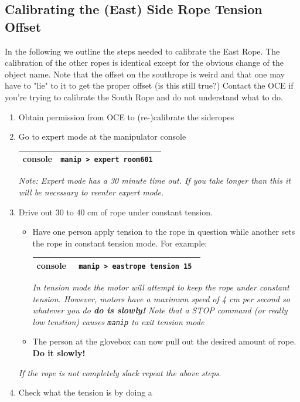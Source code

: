 \documentclass[11pt]{article}
\begin{document}
\subsection{Calibrating the (East) Side Rope Tension Offset}
In the following we outline the steps needed to calibrate the East Rope. The calibration of the other ropes is identical except for the obvious change of the object name. Note that the offset on the southrope is weird and that one may have to "lie" to it to get the proper offset (is this still true?) Contact the OCE if you're trying to calibrate the South Rope and do not understand what to do.
\begin{enumerate}
\item \CheckBox[name=cesr1]{} Obtain permission from OCE to (re-)calibrate the sideropes
\item \CheckBox[name=cesr2]{} Go to expert mode at the manipulator console
\begin{center}
\begin{tabular}{|c|c|}
\hline
console & \verb+manip > expert room601 +\\
\hline
\end{tabular}
\end{center}
{\it Note: Expert mode has a 30 minute time out. If you take longer than this it will be necessary to reenter expert mode.}
\item \CheckBox[name=cesr3]{} Drive out 30 to 40 cm of rope under constant tension.
\begin{itemize}
\item Have one person apply tension to the rope in question while another sets the rope in constant tension mode. For example:
\begin{center}
\begin{tabular}{|c|c|}
\hline
console & \verb+ manip > eastrope tension 15 +\\
\hline
\end{tabular}
\end{center}
{\it In tension mode the motor will attempt to keep the rope under constant tension. However, motors have a maximum speed of 4 cm per second so whatever you do {\bf do is slowly!} Note that a STOP command (or really low tenstion) causes \verb+manip+ to exit tension mode}
\item The person at the glovebox can now pull out the desired amount of rope. {\bf Do it slowly!}
\end{itemize}
{\it If the rope is not completely slack repeat the above steps}.
\item \CheckBox[name=cesr4]{} Check what the tension is by doing a 

\end{enumerate}
\end{document}
